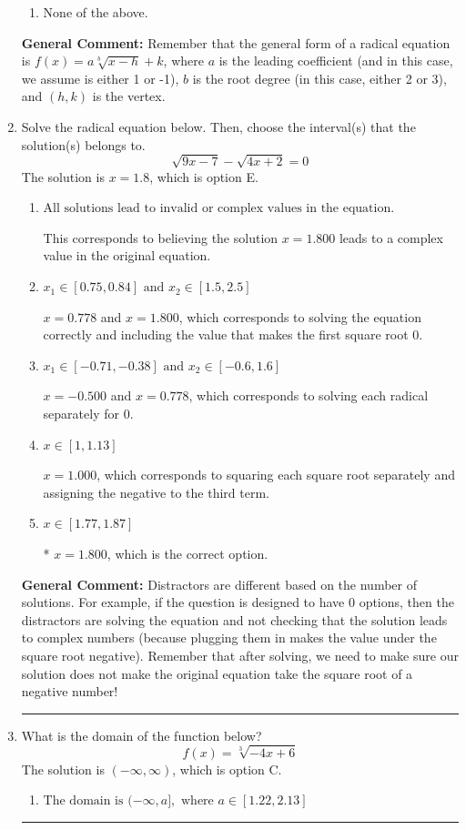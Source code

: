 \documentclass{extbook}[14pt]
\newcommand{\litem}[1]{\item #1

\rule{\textwidth}{0.4pt}}
\begin{document}
\begin{enumerate}
{\begin{enumerate}[label=\Alph*.]
\begin{multicols}{2}
\end{multicols}\item None of the above.\end{enumerate}
\textbf{General Comment:} Remember that the general form of a radical equation is $ f(x) = a \sqrt[b]{x - h} + k $, where $a$ is the leading coefficient (and in this case, we assume is either 1 or -1), $b$ is the root degree (in this case, either 2 or 3), and $(h, k)$ is the vertex.
}
\litem{
Solve the radical equation below. Then, choose the interval(s) that the solution(s) belongs to.
\[ \sqrt{9 x - 7} - \sqrt{4 x + 2} = 0 \]
The solution is \( x = 1.8 \), which is option E.\begin{enumerate}[label=\Alph*.]
\item \( \text{All solutions lead to invalid or complex values in the equation.} \)

This corresponds to believing the solution $x = 1.800$ leads to a complex value in the original equation.
\item \( x_1 \in [0.75, 0.84] \text{ and } x_2 \in [1.5,2.5] \)

$x = 0.778$ and $x = 1.800$, which corresponds to solving the equation correctly and including the value that makes the first square root 0.
\item \( x_1 \in [-0.71, -0.38] \text{ and } x_2 \in [-0.6,1.6] \)

$x = -0.500$ and $x = 0.778$, which corresponds to solving each radical separately for 0.
\item \( x \in [1,1.13] \)

$x = 1.000$, which corresponds to squaring each square root separately and assigning the negative to the third term.
\item \( x \in [1.77,1.87] \)

* $x = 1.800$, which is the correct option.
\end{enumerate}

\textbf{General Comment:} Distractors are different based on the number of solutions. For example, if the question is designed to have 0 options, then the distractors are solving the equation and not checking that the solution leads to complex numbers (because plugging them in makes the value under the square root negative). Remember that after solving, we need to make sure our solution does not make the original equation take the square root of a negative number!
}
\litem{
What is the domain of the function below?
\[ f(x) = \sqrt[3]{-4 x + 6} \]
The solution is \( (-\infty, \infty) \), which is option C.\begin{enumerate}[label=\Alph*.]
\item \( \text{The domain is } (-\infty, a], \text{   where } a \in [1.22, 2.13] \)


\end{enumerate}}
\end{enumerate}
\end{document}
